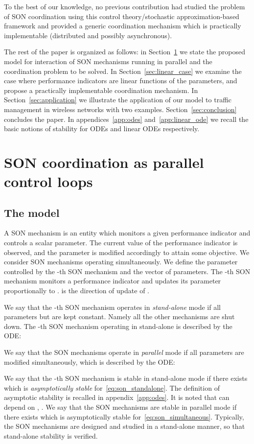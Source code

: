 \documentclass[10pt,conference,letterpaper]{IEEEtran}
\begin{document}
	To the best of our knowledge, no previous contribution had studied the problem of \ac{SON} coordination using this control theory/stochastic approximation-based framework and provided a generic coordination mechanism which is practically implementable (distributed and possibly asynchronous).

The rest of the paper is organized as follows: in Section~\ref{sec:parallel_control_loops} we state the proposed model for interaction of \ac{SON} mechanisms running in parallel and the coordination problem to be solved. In Section~\ref{sec:linear_case} we examine the case where performance indicators are linear functions of the parameters, and propose a practically implementable coordination mechanism. In Section~\ref{sec:application} we illustrate the application of our model to traffic management in wireless networks with two examples. Section~\ref{sec:conclusion} concludes the paper. In appendices~\ref{app:odes} and~\ref{app:linear_ode} we recall the basic notions of stability for \acp{ODE} and linear \acp{ODE} respectively.
\section{SON coordination as parallel control loops}\label{sec:parallel_control_loops}
\subsection{The model}
	A \ac{SON} mechanism is an entity which monitors a given performance indicator and controls a scalar parameter. The current value of the performance indicator is observed, and the parameter is modified accordingly to attain some objective. We consider  \ac{SON} mechanisms operating simultaneously. We define  the parameter controlled by the -th \ac{SON} mechanism and  the vector of parameters. The -th \ac{SON} mechanism monitors a performance indicator and updates its parameter  proportionally to .  is the direction of update of .

	We say that the -th \ac{SON} mechanism operates in \emph{stand-alone} mode if all parameters but  are kept constant. Namely all the other mechanisms are shut down. The -th \ac{SON} mechanism operating in stand-alone is described by the \ac{ODE}:

	We say that the \ac{SON} mechanisms operate in \emph{parallel} mode if all parameters are modified simultaneously, which is described by the \ac{ODE}:

 	We say that the -th \ac{SON} mechanism is stable in stand-alone mode if there exists  which is \emph{asymptotically stable} for~\eqref{eq:son_standalone}. The definition of asymptotic stability is recalled in appendix~\ref{app:odes}. It is noted that  can depend on , . We say that the \ac{SON} mechanisms are stable in parallel mode if there exists  which is asymptotically stable for~\eqref{eq:son_simultaneous}. Typically, the \ac{SON} mechanisms are designed and studied in a stand-alone manner, so that stand-alone stability is verified. 
	
\end{document}
